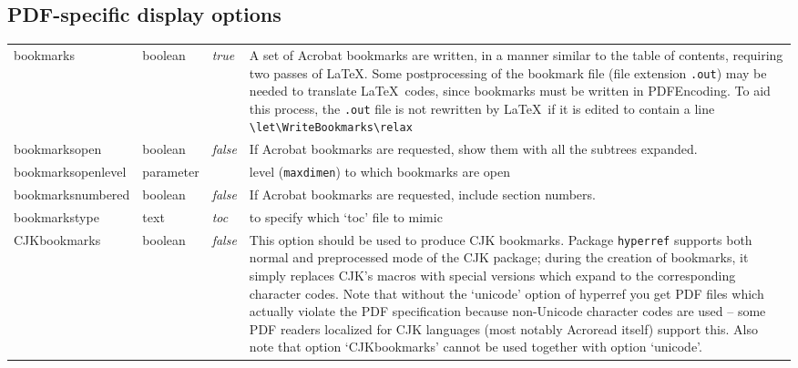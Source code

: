 \documentclass{article}
\newcommand*{\xpackage}[1]{\textsf{#1}}
\newcommand{\bs}{\symbol{'134}}%
\newcommand{\ci}[1]{\texttt{\bs#1}}
\begin{document}
\subsection{PDF-specific display options}
\begin{longtable}{@{}>{\ttfamily}ll>{\itshape}lp{7.6cm}@{}}
bookmarks          & boolean   & true   & A set of Acrobat bookmarks are written, in a manner similar to the
                                           table of contents, requiring two passes of \LaTeX. Some postprocessing
                                           of the bookmark file (file extension \texttt{.out}) may be needed to
                                           translate \LaTeX\ codes, since bookmarks must be written in  PDFEncoding.
                                           To aid this  process, the \texttt{.out} file is not rewritten by \LaTeX\
                                           if it is edited to contain a line \verb|\let\WriteBookmarks\relax| \\
bookmarksopen      & boolean   & false   & If Acrobat bookmarks are requested, show them with all the subtrees
                                           expanded. \\
bookmarksopenlevel & parameter &         & level (\ci{maxdimen}) to which bookmarks are open \\
bookmarksnumbered  & boolean   & false   & If Acrobat bookmarks are requested, include section numbers. \\
bookmarkstype      & text      & toc     & to specify which `toc' file to mimic \\
CJKbookmarks       & boolean   & false   &
    This option should be used to produce CJK bookmarks.
    Package \verb|hyperref|
    supports both normal and preprocessed mode of the \xpackage{CJK} package;
    during the creation of bookmarks, it simply replaces CJK's macros
    with special versions which expand to the corresponding character
    codes.  Note that without the `unicode' option of \xpackage{hyperref} you get
    PDF files which actually violate the PDF specification because
    non-Unicode character codes are used -- some PDF readers localized
    for CJK languages (most notably Acroread itself) support this.
    Also note that option `CJKbookmarks' cannot be used together
    with option `unicode'.


\end{longtable}
\end{document}
